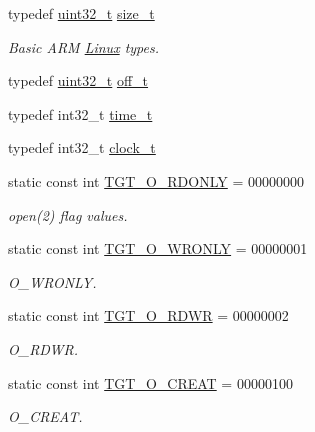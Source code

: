  \begin{DoxyCompactItemize}
\item 
typedef \hyperlink{Type_8hh_a435d1572bf3f880d55459d9805097f62}{uint32\_\-t} \hyperlink{classArmLinux32_a29d85914ddff32967d85ada69854206d}{size\_\-t}
\begin{DoxyCompactList}\small\item\em Basic ARM \hyperlink{classLinux}{Linux} types. \item\end{DoxyCompactList}\item 
typedef \hyperlink{Type_8hh_a435d1572bf3f880d55459d9805097f62}{uint32\_\-t} \hyperlink{classArmLinux32_aac46e03c2018bada012333c31f41df12}{off\_\-t}
\item 
typedef int32\_\-t \hyperlink{classArmLinux32_a9c837e14046ebcf4099bb559bd6637ca}{time\_\-t}
\item 
typedef int32\_\-t \hyperlink{classArmLinux32_af9bbc36b03eced2f192e46d55e703b58}{clock\_\-t}
\item 
static const int \hyperlink{classArmLinux32_ad266b23a0ae07d1833e18bae651f3411}{TGT\_\-O\_\-RDONLY} = 00000000
\begin{DoxyCompactList}\small\item\em open(2) flag values. \item\end{DoxyCompactList}\item 
static const int \hyperlink{classArmLinux32_a6156c069cefe05ce3cce033b2e0c2de2}{TGT\_\-O\_\-WRONLY} = 00000001
\begin{DoxyCompactList}\small\item\em O\_\-WRONLY. \item\end{DoxyCompactList}\item 
static const int \hyperlink{classArmLinux32_ac6fa9ecf5d2f3314f197698f1099e2ac}{TGT\_\-O\_\-RDWR} = 00000002
\begin{DoxyCompactList}\small\item\em O\_\-RDWR. \item\end{DoxyCompactList}\item 
static const int \hyperlink{classArmLinux32_aec02e04ca367e6c3f4b46e4edc12efac}{TGT\_\-O\_\-CREAT} = 00000100
\begin{DoxyCompactList}\small\item\em O\_\-CREAT. \item\end{DoxyCompactList}\item 

\end{DoxyCompactItemize}
